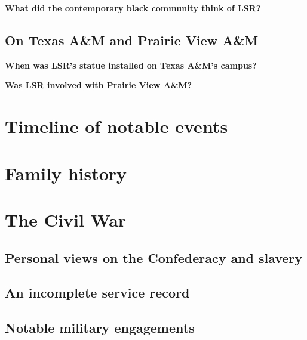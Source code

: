 \documentclass[12pt]{article}
\begin{document}
\textbf{What did the contemporary black community think of LSR? \\ }

\subsection{On Texas A\&M and Prairie View A\&M}
\textbf{When was LSR's statue installed on Texas A\&M's campus? \\ }

\textbf{Was LSR involved with Prairie View A\&M? \\ }

\newpage
\section{Timeline of notable events}

\newpage
\section{Family history}

\newpage
\section{The Civil War}

\subsection{Personal views on the Confederacy and slavery}

\subsection{An incomplete service record}

\subsection{Notable military engagements}

\newpage
\end{document}
